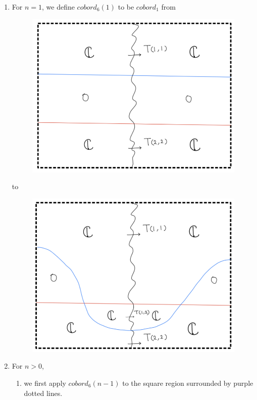 \begin{enumerate}[label=(\roman*)]
\item For $n=1$, we define $cobord_6(1)$ to be $cobord_1$ from
\begin{figure}[H]
    \centering
    \includegraphics[scale = 0.75]{diagrams/cobord6/2.png}
    \caption{}
    \label{fig:your-label}
\end{figure}
to
\begin{figure}[H]
    \centering
    \includegraphics[scale = 0.75]{diagrams/cobord6/3.png}
    \caption{}
    \label{fig:your-label}
\end{figure}
\pagebreak 
\item For $n>0$,
\begin{enumerate}[label=(Step \arabic*)]
\item we first apply $cobord_6(n-1)$ to the square region surrounded by purple dotted lines.


\end{enumerate}
\end{enumerate}
